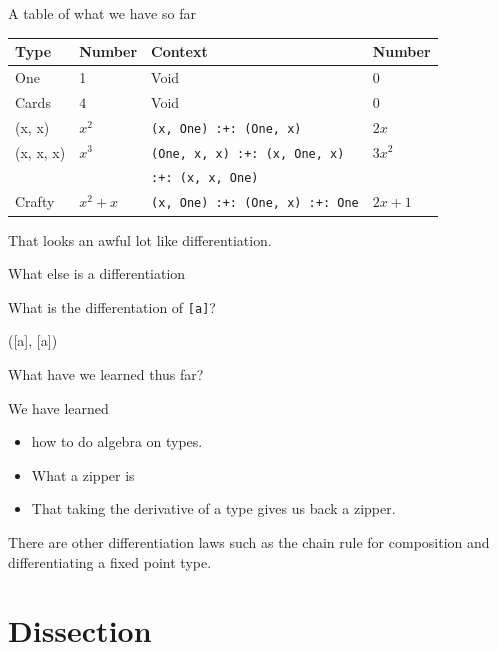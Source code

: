 \documentclass[ignorenonframetext,]{beamer}
\begin{document}
\begin{frame}[fragile]{A table of what we have so far}

\begin{longtable}[c]{@{}llll@{}}
\toprule
Type & Number & Context & Number\tabularnewline
\midrule
\endhead
One & 1 & Void & 0\tabularnewline
Cards & 4 & Void & 0\tabularnewline
(x, x) & \(x^2\) & \texttt{(x,\ One)\ :+:\ (One,\ x)} &
\(2x\)\tabularnewline
(x, x, x) & \(x^3\) & \texttt{(One,\ x,\ x)\ :+:\ (x,\ One,\ x)} &
\(3x^2\)\tabularnewline
& & \texttt{:+:\ (x,\ x,\ One)} &\tabularnewline
Crafty & \(x^2 + x\) & \texttt{(x,\ One)\ :+:\ (One,\ x)\ :+:\ One} &
\(2x +1\)\tabularnewline
\bottomrule
\end{longtable}

\pause

That looks an awful lot like differentiation.

\end{frame}

\begin{frame}[fragile]{What else is a differentiation}

What is the differentation of \texttt{{[}a{]}}?

\pause

({[}a{]}, {[}a{]})

\end{frame}

\begin{frame}[fragile]{What have we learned thus far?}

We have learned

\begin{itemize}
\itemsep1pt\parskip0pt
\item
  how to do algebra on types.
\item
  What a zipper is
\item
  That taking the derivative of a type gives us back a zipper.
\end{itemize}

There are other differentiation laws such as the chain rule for
composition and differentiating a fixed point type.

\end{frame}

\section{Dissection}\label{dissection}

\end{document}
